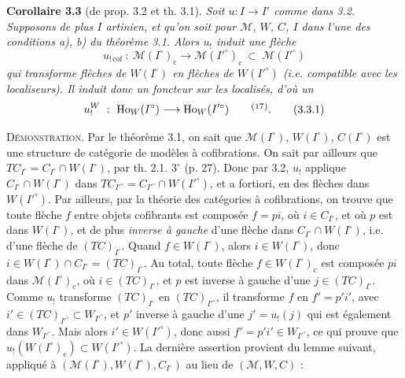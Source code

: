 \textbf{Corollaire 3.3} (de prop. 3.2 et th. 3.1). \textit{Soit $u:I\longrightarrow I'$ comme dans \textup{3.2}. Supposons de plus $I$ artinien, et}
\textit{qu'on soit pour $\mathcal{M}$, $W$, $C$, $I$ dans l'une des conditions \textup{a), b)} du théorème \textup{3.1}. Alors $u_!$ induit une flèche}
\[
u_{!\,\mathrm{cof}}\ :\ \mathcal{M}(I^\circ)_{\mathrm{c}} \longrightarrow \mathcal{M}(I'^\circ)_{\mathrm{c}}\ \subset\ \mathcal{M}(I'^\circ)
\]
\textit{qui transforme flèches de $W(I^\circ)$ en flèches de $W(I'^\circ)$ (i.e. compatible avec les localiseurs). Il induit donc un foncteur sur les localisés, d'où un}
\[
u_!^W\ :\ \mathrm{Ho}_W(I^\circ) \longrightarrow \mathrm{Ho}_W(I'^\circ) \qquad \mbox{\textsuperscript{(}\footnotemark[17]\textsuperscript{)}}.
\tag*{(3.3.1)}
\]

\textsc{Démonstration}. Par le théorème 3.1, on sait que $\mathcal{M}(I^\circ)$, $W(I^\circ)$, $C(I^\circ)$ est une structure de catégorie de modèles à cofibrations. On sait par ailleurs que $TC_{I^\circ}=C_{I^\circ}\cap W(I^\circ)$, par th. 2.1. $3^\circ$ (p. 27). Donc par 3.2, $u_!$ applique $C_{I^\circ}\cap W(I^\circ)$ dans $TC_{I'^\circ}=C_{I'^\circ}\cap W(I'^\circ)$, et a fortiori, en des flèches dans $W(I'^\circ)$. Par ailleurs, par la théorie des catégories à cofibrations, on trouve que toute flèche $f$ entre objets cofibrants est composée $f=pi$, où $i\in C_{I^\circ}$, et où $p$ est dans $W(I^\circ)$, et de plus \textit{inverse à gauche} d'une flèche dans $C_{I^\circ}\cap W(I^\circ)$, i.e. d'une flèche de $(TC)_{I^\circ}$. Quand
$f\in W(I^\circ)$, alors $i\in W(I^\circ)$, donc $i\in W(I^\circ)\cap C_{I^\circ}=(TC)_{I^\circ}$. Au total, toute flèche $f\in W(I^\circ)_{\mathrm{c}}$ est composée $pi$ dans $\mathcal{M}(I^\circ)_{\mathrm{c}}$, où $i\in(TC)_{I^\circ}$, et $p$ est inverse à gauche d'une $j\in(TC)_{I^\circ}$. Comme $u_!$ transforme $(TC)_{I^\circ}$ en $(TC)_{I'^\circ}$, il transforme $f$ en $f'=p'i'$, avec $i'\in(TC)_{I'^\circ}\subset W_{I'^\circ}$, et $p'$ inverse à gauche d'une $j'=u_!(j)$ qui est également dans $W_{I'^\circ}$. Mais alors $i'\in W(I'^\circ)$, donc aussi $f'=p'i'\in W_{I'^\circ}$, ce qui prouve que $u_!(W(I^\circ)_{\mathrm{c}})\subset W(I'^\circ)$. La dernière assertion provient du lemme suivant, appliqué à $(\mathcal{M}(I^\circ),W(I^\circ),C_{I^\circ})$ au lieu de $(\mathcal{M},W,C)$ :

